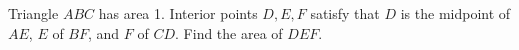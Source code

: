 Triangle $ABC$ has area 1. Interior points $D,E,F$ satisfy that $D$ is the midpoint of $AE$, $E$ of $BF$, and $F$ of $CD$. Find the area of $DEF$.
